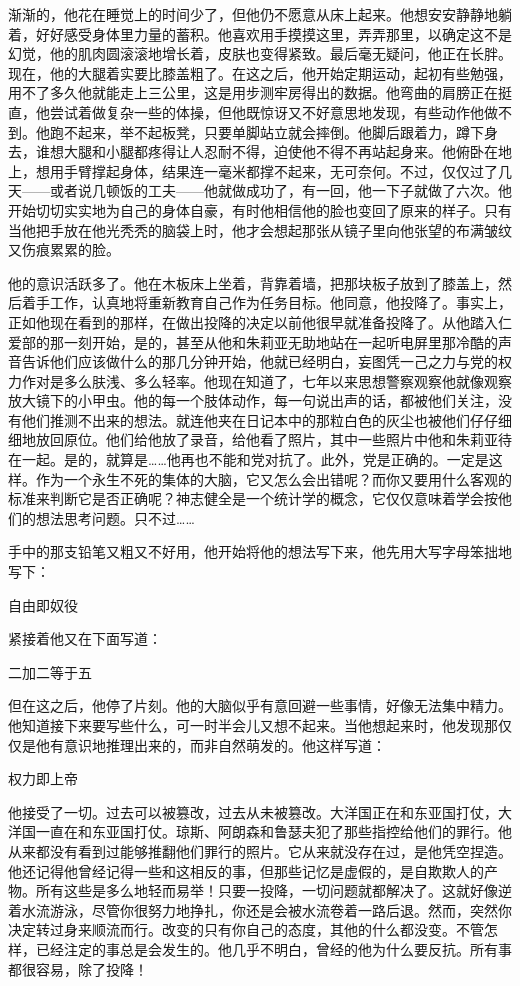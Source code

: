 渐渐的，他花在睡觉上的时间少了，但他仍不愿意从床上起来。他想安安静静地躺着，好好感受身体里力量的蓄积。他喜欢用手摸摸这里，弄弄那里，以确定这不是幻觉，他的肌肉圆滚滚地增长着，皮肤也变得紧致。最后毫无疑问，他正在长胖。现在，他的大腿着实要比膝盖粗了。在这之后，他开始定期运动，起初有些勉强，用不了多久他就能走上三公里，这是用步测牢房得出的数据。他弯曲的肩膀正在挺直，他尝试着做复杂一些的体操，但他既惊讶又不好意思地发现，有些动作他做不到。他跑不起来，举不起板凳，只要单脚站立就会摔倒。他脚后跟着力，蹲下身去，谁想大腿和小腿都疼得让人忍耐不得，迫使他不得不再站起身来。他俯卧在地上，想用手臂撑起身体，结果连一毫米都撑不起来，无可奈何。不过，仅仅过了几天------或者说几顿饭的工夫------他就做成功了，有一回，他一下子就做了六次。他开始切切实实地为自己的身体自豪，有时他相信他的脸也变回了原来的样子。只有当他把手放在他光秃秃的脑袋上时，他才会想起那张从镜子里向他张望的布满皱纹又伤痕累累的脸。

他的意识活跃多了。他在木板床上坐着，背靠着墙，把那块板子放到了膝盖上，然后着手工作，认真地将重新教育自己作为任务目标。他同意，他投降了。事实上，正如他现在看到的那样，在做出投降的决定以前他很早就准备投降了。从他踏入仁爱部的那一刻开始，是的，甚至从他和朱莉亚无助地站在一起听电屏里那冷酷的声音告诉他们应该做什么的那几分钟开始，他就已经明白，妄图凭一己之力与党的权力作对是多么肤浅、多么轻率。他现在知道了，七年以来思想警察观察他就像观察放大镜下的小甲虫。他的每一个肢体动作，每一句说出声的话，都被他们关注，没有他们推测不出来的想法。就连他夹在日记本中的那粒白色的灰尘也被他们仔仔细细地放回原位。他们给他放了录音，给他看了照片，其中一些照片中他和朱莉亚待在一起。是的，就算是\ldots\ldots 他再也不能和党对抗了。此外，党是正确的。一定是这样。作为一个永生不死的集体的大脑，它又怎么会出错呢？而你又要用什么客观的标准来判断它是否正确呢？神志健全是一个统计学的概念，它仅仅意味着学会按他们的想法思考问题。只不过\ldots\ldots{}

手中的那支铅笔又粗又不好用，他开始将他的想法写下来，他先用大写字母笨拙地写下：

自由即奴役

紧接着他又在下面写道：

二加二等于五

但在这之后，他停了片刻。他的大脑似乎有意回避一些事情，好像无法集中精力。他知道接下来要写些什么，可一时半会儿又想不起来。当他想起来时，他发现那仅仅是他有意识地推理出来的，而非自然萌发的。他这样写道：

权力即上帝

他接受了一切。过去可以被篡改，过去从未被篡改。大洋国正在和东亚国打仗，大洋国一直在和东亚国打仗。琼斯、阿朗森和鲁瑟夫犯了那些指控给他们的罪行。他从来都没有看到过能够推翻他们罪行的照片。它从来就没存在过，是他凭空捏造。他还记得他曾经记得一些和这相反的事，但那些记忆是虚假的，是自欺欺人的产物。所有这些是多么地轻而易举！只要一投降，一切问题就都解决了。这就好像逆着水流游泳，尽管你很努力地挣扎，你还是会被水流卷着一路后退。然而，突然你决定转过身来顺流而行。改变的只有你自己的态度，其他的什么都没变。不管怎样，已经注定的事总是会发生的。他几乎不明白，曾经的他为什么要反抗。所有事都很容易，除了投降！

